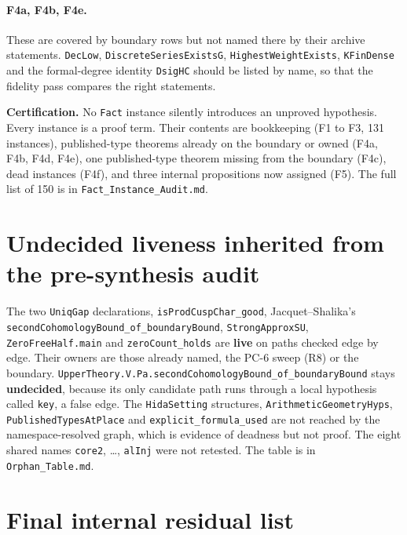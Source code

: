 \documentclass[11pt]{article}
\newcommand{\lean}[1]{\nolinkurl{#1}}
\newcommand{\Lpath}[1]{\nolinkurl{#1}}
\newcommand{\PC}[1]{PC-#1}
\theoremstyle{remark}
\begin{document}
\paragraph{F4a, F4b, F4e.} These are covered by boundary rows but not named there by their archive statements. \lean{DecLow}, \lean{DiscreteSeriesExistsG}, \lean{HighestWeightExists}, \lean{KFinDense} and the formal-degree identity \lean{DsigHC} should be listed by name, so that the fidelity pass compares the right statements.

\textbf{Certification.} No \lean{Fact} instance silently introduces an unproved hypothesis. Every instance is a proof term. Their contents are bookkeeping (F1 to F3, 131 instances), published-type theorems already on the boundary or owned (F4a, F4b, F4d, F4e), one published-type theorem missing from the boundary (F4c), dead instances (F4f), and three internal propositions now assigned (F5). The full list of 150 is in \Lpath{Fact_Instance_Audit.md}.

\section{Undecided liveness inherited from the pre-synthesis audit}

The two \lean{UniqGap} declarations, \lean{isProdCuspChar_good}, Jacquet--Shalika's \lean{secondCohomologyBound_of_boundaryBound}, \lean{StrongApproxSU}, \lean{ZeroFreeHalf.main} and \lean{zeroCount_holds} are \textbf{live} on paths checked edge by edge. Their owners are those already named, the \PC{6} sweep (R8) or the boundary. \lean{UpperTheory.V.Pa.secondCohomologyBound_of_boundaryBound} stays \textbf{undecided}, because its only candidate path runs through a local hypothesis called \lean{key}, a false edge. The \lean{HidaSetting} structures, \lean{ArithmeticGeometryHyps}, \lean{PublishedTypesAtPlace} and \lean{explicit_formula_used} are not reached by the namespace-resolved graph, which is evidence of deadness but not proof. The eight shared names \lean{core2}, \dots, \lean{alInj} were not retested. The table is in \Lpath{Orphan_Table.md}.

\section{Final internal residual list}\label{sec:residuals}
\end{document}
